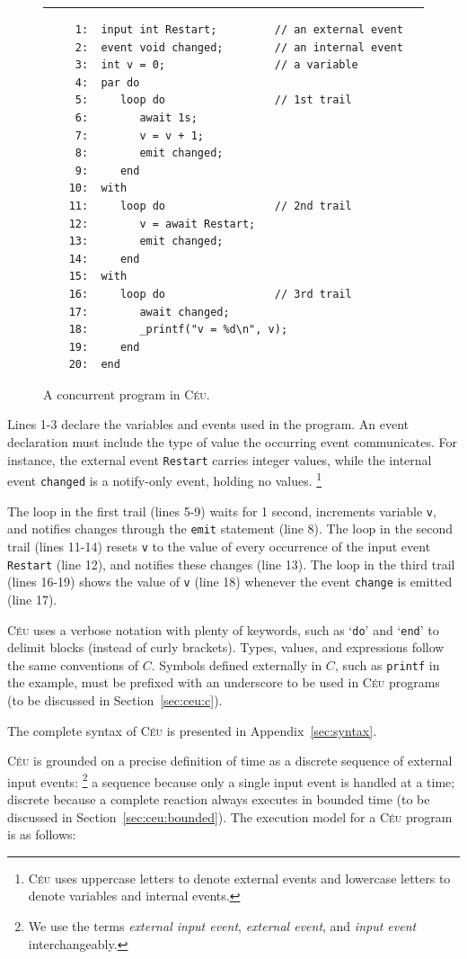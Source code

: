 \documentclass[11pt,a4paper]{article}
\newcommand{\2}{\;\;}
\newcommand{\5}{\;\;\;\;\;}
\newcommand{\CEU}{\textsc{C\'{e}u}}
\newcommand{\code}[1] {{\small{\texttt{#1}}}}
\begin{document}
\begin{figure}[h]
\rule{15cm}{0.37pt}
{\small
\begin{verbatim}
     1:  input int Restart;         // an external event
     2:  event void changed;        // an internal event
     3:  int v = 0;                 // a variable
     4:  par do
     5:     loop do                 // 1st trail
     6:        await 1s;
     7:        v = v + 1;
     8:        emit changed;
     9:     end
    10:  with
    11:     loop do                 // 2nd trail
    12:        v = await Restart;
    13:        emit changed;
    14:     end
    15:  with
    16:     loop do                 // 3rd trail
    17:        await changed;
    18:        _printf("v = %d\n", v);
    19:     end
    20:  end
\end{verbatim}
}
\caption{ A concurrent program in \CEU{}.
\label{lst:ceu:1}
}
\end{figure}

Lines 1-3 declare the variables and events used in the program.
An event declaration must include the type of value the occurring event 
communicates.
For instance, the external event \code{Restart} carries integer values, while 
the internal event \code{changed} is a notify-only event, holding no values.
\footnote{\CEU{} uses uppercase letters to denote external events and lowercase 
letters to denote variables and internal events.}

The loop in the first trail (lines 5-9) waits for 1 second, increments variable 
\code{v}, and notifies changes through the \code{emit} statement (line 8).
The loop in the second trail (lines 11-14) resets \code{v} to the value of 
every occurrence of the input event \code{Restart} (line 12), and notifies 
these changes (line 13).
The loop in the third trail (lines 16-19) shows the value of \code{v} (line 18) 
whenever the event \code{change} is emitted (line 17).

\CEU{} uses a verbose notation with plenty of keywords, such as `\code{do}' and 
`\code{end}' to delimit blocks (instead of curly brackets).
Types, values, and expressions follow the same conventions of $C$.
Symbols defined externally in $C$, such as \code{printf} in the example, must 
be prefixed with an underscore to be used in \CEU{} programs (to be discussed 
in Section~\ref{sec:ceu:c}).

The complete syntax of \CEU{} is presented in Appendix~\ref{sec:syntax}.

\CEU{} is grounded on a precise definition of time as a discrete sequence of 
external input events:%
\footnote{We use the terms \emph{external input event}, \emph{external event}, 
and \emph{input event} interchangeably.}
a sequence because only a single input event is handled at a time; discrete 
because a complete reaction always executes in bounded time (to be discussed in 
Section~\ref{sec:ceu:bounded}).
The execution model for a \CEU{} program is as follows:
\end{document}
